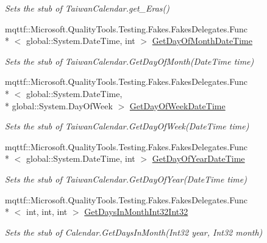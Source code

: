 \begin{DoxyCompactItemize}
\begin{DoxyCompactList}\small\item\em Sets the stub of Taiwan\-Calendar.\-get\-\_\-\-Eras()\end{DoxyCompactList}\item 
mqttf\-::\-Microsoft.\-Quality\-Tools.\-Testing.\-Fakes.\-Fakes\-Delegates.\-Func\\*
$<$ global\-::\-System.\-Date\-Time, int $>$ \hyperlink{class_system_1_1_globalization_1_1_fakes_1_1_stub_taiwan_calendar_a3f1ffec633864af718c244634d536110}{Get\-Day\-Of\-Month\-Date\-Time}
\begin{DoxyCompactList}\small\item\em Sets the stub of Taiwan\-Calendar.\-Get\-Day\-Of\-Month(\-Date\-Time time)\end{DoxyCompactList}\item 
mqttf\-::\-Microsoft.\-Quality\-Tools.\-Testing.\-Fakes.\-Fakes\-Delegates.\-Func\\*
$<$ global\-::\-System.\-Date\-Time, \\*
global\-::\-System.\-Day\-Of\-Week $>$ \hyperlink{class_system_1_1_globalization_1_1_fakes_1_1_stub_taiwan_calendar_a99b48f09363b75718c3359ba9bfa120e}{Get\-Day\-Of\-Week\-Date\-Time}
\begin{DoxyCompactList}\small\item\em Sets the stub of Taiwan\-Calendar.\-Get\-Day\-Of\-Week(\-Date\-Time time)\end{DoxyCompactList}\item 
mqttf\-::\-Microsoft.\-Quality\-Tools.\-Testing.\-Fakes.\-Fakes\-Delegates.\-Func\\*
$<$ global\-::\-System.\-Date\-Time, int $>$ \hyperlink{class_system_1_1_globalization_1_1_fakes_1_1_stub_taiwan_calendar_abb5ae5d5efad3ac0c0f039d817b45bdf}{Get\-Day\-Of\-Year\-Date\-Time}
\begin{DoxyCompactList}\small\item\em Sets the stub of Taiwan\-Calendar.\-Get\-Day\-Of\-Year(\-Date\-Time time)\end{DoxyCompactList}\item 
mqttf\-::\-Microsoft.\-Quality\-Tools.\-Testing.\-Fakes.\-Fakes\-Delegates.\-Func\\*
$<$ int, int, int $>$ \hyperlink{class_system_1_1_globalization_1_1_fakes_1_1_stub_taiwan_calendar_aa5b50f37105306ae4e927e25b8214f7c}{Get\-Days\-In\-Month\-Int32\-Int32}
\begin{DoxyCompactList}\small\item\em Sets the stub of Calendar.\-Get\-Days\-In\-Month(\-Int32 year, Int32 month)\end{DoxyCompactList}\item 

\end{DoxyCompactItemize}
